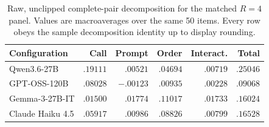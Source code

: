\begin{table}[t]
\centering
\small
\setlength{\tabcolsep}{2.3pt}
\begin{tabular}{lrrrrr}
\toprule
Configuration & Call & Prompt & Order & Interact. & Total \\
\midrule
Qwen3.6-27B & $.19111$ & $.00521$ & $.04694$ & $.00719$ & $.25046$ \\
GPT-OSS-120B & $.08028$ & $-.00123$ & $.00935$ & $.00228$ & $.09068$ \\
Gemma-3-27B-IT & $.01500$ & $.01774$ & $.11017$ & $.01733$ & $.16024$ \\
Claude Haiku 4.5 & $.05917$ & $.00986$ & $.08826$ & $.00799$ & $.16528$ \\
\bottomrule
\end{tabular}
\caption{Raw, unclipped complete-pair decomposition for the matched \(R=4\)
panel. Values are macroaverages over the same 50 items. Every row obeys the
sample decomposition identity up to display rounding.}
\end{table}
